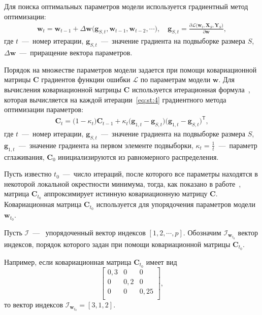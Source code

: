 Для поиска оптимальных параметров модели используется градиентный метод оптимизации:
\[
\label{eq:st:4}
\begin{aligned}
\textbf{w}_{t} = \textbf{w}_{t-1} + \Delta\textbf{w}\bigr(\textbf{g}_{S,t}, \textbf{w}_{t-1}, \textbf{w}_{t-2}, \cdots\bigr), \quad \textbf{g}_{S,t}=\frac{\partial \mathcal{L}\bigr(\textbf{w}_{t}, \textbf{X}_{S}, \textbf{Y}_{S}\bigr)}{\partial \textbf{w}},
\end{aligned}
\]
где $t$~---~номер итерации, $\textbf{g}_{S,t}$~---~значение градиента на подвыборке размера $S$, $\Delta\textbf{w}$~---~приращение вектора параметров.
 
 
Порядок на множестве параметров модели задается при помощи ковариационной матрицы $\textbf{C}$ градиентов функции ошибки $\mathcal{L}$ по параметрам модели $\textbf{w}$. Для вычисления ковариационной матрицы $\textbf{C}$ используется итерационная формула~\cite{Chunyan2016}, которая вычисляется на каждой итерации~\eqref{eq:st:4} градиентного метода оптимизации параметров:
\[
\label{eq:st:5}
\begin{aligned}
\textbf{C}_t = \bigr(1-\kappa_t\bigr)\textbf{C}_{t-1}+\kappa_t\bigr(\textbf{g}_{1,t}-\textbf{g}_{S,t}\bigr)\bigr(\textbf{g}_{1,t}-\textbf{g}_{S,t}\bigr)^{\mathsf{T}},
\end{aligned}
\]
 где $t$~---~номер итерации, $\textbf{g}_{S,t}$~---~значение градиента на подвыборке размера $S$, $\textbf{g}_{1,t}$~---~значение градиента на первом элементе подвыборки, $\kappa_t=\frac{1}{t}$~---~параметр сглаживания, $\textbf{C}_0$ инициализируются из равномерного распределения.
 
Пусть известно $t_0$~---~число итераций, после которого все параметры находятся в некоторой локальной окрестности минимума, тогда, как показано в работе~\cite{Chunyan2016}, матрица $\textbf{C}_{t_0}$ аппроксимирует истинную ковариационную матрицу $\textbf{C}$. Ковариационная матрица $\textbf{C}_{t_0}$ используется для упорядочения параметров модели $\textbf{w}_{t_0}$. 
 
Пусть $\mathcal{I}$~---~ упорядоченный вектор индексов $[1, 2, \cdots, p]$. Обозначим $\mathcal{I}_{\textbf{w}_{t_0}}$ вектор индексов, порядок которого задан при помощи ковариационной матрицы $\textbf{C}_{t_0}$. 
 
Например, если ковариационная матрица $\textbf{C}_{t_0}$  имеет вид
 $$
\begin{bmatrix}
0{,}3& 0 & 0\\
0& 0{,}2 & 0\\
0& 0 & 0{,}25\\
\end{bmatrix},
 $$
 то вектор индексов $\mathcal{I}_{\textbf{w}_{t_0}} = [3,1,2]$.
 

